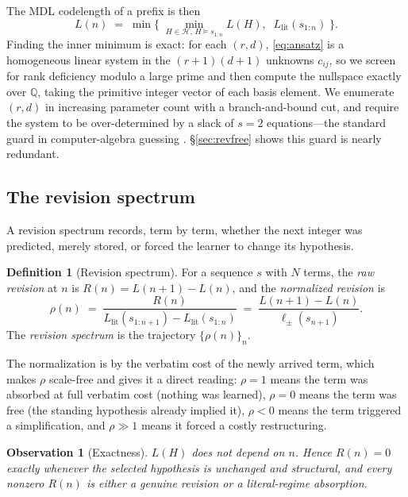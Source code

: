 \documentclass[10pt]{article}
\theoremstyle{definition}
\newtheorem{definition}{Definition}
\theoremstyle{plain}
\newtheorem{observation}{Observation}
\newcommand{\Llit}{L_{\mathrm{lit}}}
\newcommand{\Prec}{\mathcal{H}}
\begin{document}
The MDL codelength of a prefix is then
\begin{equation}
L(n) \;=\; \min\Big\{\; \min_{H \in \Prec,\, H \models s_{1:n}} L(H),
\;\; \Llit(s_{1:n}) \;\Big\}.
\label{eq:Ln}
\end{equation}
Finding the inner minimum is exact: for each $(r,d)$, \eqref{eq:ansatz} is a
homogeneous linear system in the $(r{+}1)(d{+}1)$ unknowns $c_{ij}$, so we
screen for rank deficiency modulo a large prime and then compute the nullspace
exactly over $\mathbb{Q}$, taking the primitive integer vector of each basis
element. We enumerate $(r,d)$ in increasing parameter count with a
branch-and-bound cut, and require the system to be over-determined by a slack
of $s = 2$ equations---the standard guard in computer-algebra guessing
\citep{kauers2009}. \S\ref{sec:revfree} shows this guard is nearly redundant.

\subsection{The revision spectrum}

A revision spectrum records, term by term, whether the next integer was
predicted, merely stored, or forced the learner to change its hypothesis.

\begin{definition}[Revision spectrum]
For a sequence $s$ with $N$ terms, the \emph{raw revision} at $n$ is
$R(n) = L(n{+}1) - L(n)$, and the \emph{normalized revision} is
\begin{equation}
\rho(n) \;=\; \frac{R(n)}{\Llit(s_{1:n+1}) - \Llit(s_{1:n})}
        \;=\; \frac{L(n{+}1) - L(n)}{\ell_{\pm}(s_{n+1})}.
\end{equation}
The \emph{revision spectrum} is the trajectory $\{\rho(n)\}_{n}$.
\end{definition}

The normalization is by the verbatim cost of the newly arrived term, which
makes $\rho$ scale-free and gives it a direct reading: $\rho = 1$ means the
term was absorbed at full verbatim cost (nothing was learned), $\rho = 0$ means
the term was free (the standing hypothesis already implied it), $\rho < 0$
means the term triggered a simplification, and $\rho \gg 1$ means it forced a
costly restructuring.

\begin{observation}[Exactness]
$L(H)$ does not depend on $n$. Hence $R(n) = 0$ \emph{exactly} whenever the
selected hypothesis is unchanged and structural, and every nonzero $R(n)$ is
either a genuine revision or a literal-regime absorption.
\end{observation}
\end{document}
